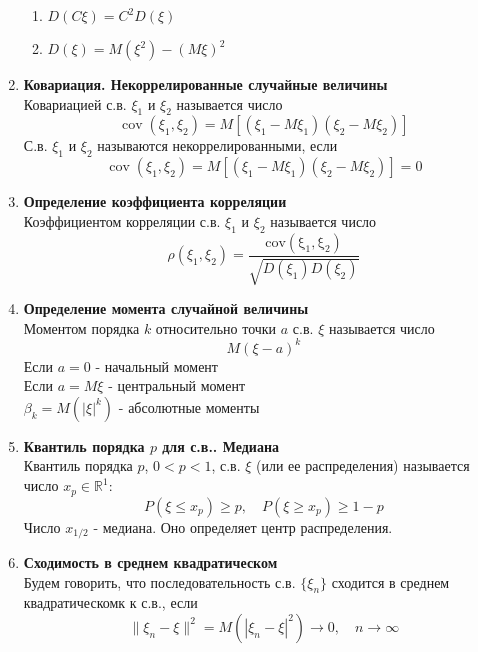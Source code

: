 \documentclass[A4]{article}
\begin{document}
\begin{enumerate}
\begin{enumerate}
		\item $D(C\xi)=C^2D(\xi)$
		\item $D(\xi)=M(\xi^2)-(M\xi)^2$
	\end{enumerate}
	\item \textbf{Ковариация. Некоррелированные случайные величины}\\
	Ковариацией с.в. $\xi_1$ и $\xi_2$ называется число
	\begin{equation}
	\operatorname{cov}(\xi_1,\xi_2)=M[(\xi_1-M\xi_1)(\xi_2-M\xi_2)]
	\end{equation}
	С.в. $\xi_1$ и $\xi_2$ называются некоррелированными, если 
	\begin{equation}
	\operatorname{cov}(\xi_1,\xi_2)=M[(\xi_1-M\xi_1)(\xi_2-M\xi_2)]=0
	\end{equation}
	\item \textbf{Определение коэффициента корреляции}\\
	Коэффициентом корреляции с.в. $\xi_1$ и $\xi_2$ называется число
	\begin{equation}
	\rho(\xi_1,\xi_2)=\frac{\operatorname{cov(\xi_1,\xi_2)}}{\sqrt{D(\xi_1)D(\xi_2)}}
	\end{equation}
	\item \textbf{Определение момента случайной величины}\\
	Моментом порядка $k$ относительно точки $a$ с.в. $\xi$ называется число
	\begin{equation}
	M(\xi-a)^k
	\end{equation}
	Если $a=0$ - начальный момент\\
	Если $a=M\xi$ - центральный момент\\
	$\beta_k=M(|\xi|^k)$ - абсолютные моменты
	\item \textbf{Квантиль порядка $p$ для с.в.. Медиана}\\
	Квантиль порядка $p$, $0<p<1$, с.в. $\xi$ (или ее распределения) называется число $x_p\in \mathbb{R}^1$:
	\begin{equation}
	P(\xi\le x_p)\ge p,\quad P(\xi\ge x_p)\ge 1-p
	\end{equation}
	Число $x_{1/2}$ - медиана. Оно определяет центр распределения.
	\item \textbf{Сходимость в среднем квадратическом}\\
	Будем говорить, что последовательность с.в. $\{\xi_n\}$ сходится в среднем квадратическомк к с.в., если
	\begin{equation}
	\|\xi_n-\xi\|^2=M(|\xi_n-\xi|^2)\rightarrow 0,\quad n\rightarrow \infty
	\end{equation} 

\end{enumerate}
\end{document}
